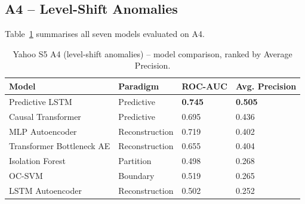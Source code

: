\subsection{A4 -- Level-Shift Anomalies}

Table~\ref{tab:yahoo-a4} summarises all seven models evaluated on A4.

\begin{table}[h]
\centering
\begin{tabular}{@{}llll@{}}
\toprule
Model & Paradigm & ROC-AUC & Avg. Precision \\
\midrule
Predictive LSTM            & Predictive     & \textbf{0.745} & \textbf{0.505} \\
Causal Transformer         & Predictive     & 0.695          & 0.436 \\
MLP Autoencoder            & Reconstruction & 0.719          & 0.402 \\
Transformer Bottleneck AE  & Reconstruction & 0.655          & 0.404 \\
Isolation Forest           & Partition      & 0.498          & 0.268 \\
OC-SVM                     & Boundary       & 0.519          & 0.265 \\
LSTM Autoencoder           & Reconstruction & 0.502          & 0.252 \\
\bottomrule
\end{tabular}
\caption{Yahoo S5 A4 (level-shift anomalies) -- model comparison, ranked by Average Precision.}
\label{tab:yahoo-a4}
\end{table}

